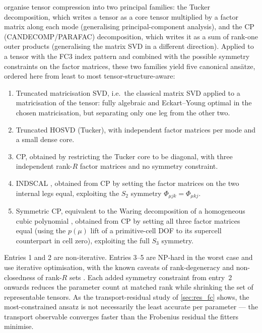 \citet{kolda_tensor_2009} organise tensor compression into two principal families: the
Tucker decomposition, which writes a tensor as a core tensor multiplied by a factor matrix
along each mode (generalising principal-component analysis), and the CP
(CANDECOMP/PARAFAC) decomposition, which writes it as a sum of rank-one outer products
(generalising the matrix SVD in a different direction). Applied to a tensor with the FC3 index
pattern and combined with the possible symmetry constraints on the factor matrices, these two
families yield five canonical ans\"atze, ordered here from least to most
tensor-structure-aware:
\begin{enumerate}
  \item Truncated matricisation SVD, i.e.\ the classical matrix SVD applied to a matricisation of
        the tensor: fully algebraic and Eckart--Young optimal in the chosen matricisation, but
        separating only one leg from the other two.
  \item Truncated HOSVD (Tucker), with independent factor matrices per mode and a small dense core.
  \item CP, obtained by restricting the Tucker core to be diagonal, with three
        independent rank-$R$ factor matrices and no symmetry constraint.
  \item INDSCAL \cite{carroll_analysis_1970}, obtained from CP by setting the
        factor matrices on the two internal legs equal, exploiting the
        $S_2$ symmetry $\Phi_{\mu j k} = \Phi_{\mu k j}$.
  \item Symmetric CP, equivalent to the Waring decomposition of a homogeneous
        cubic polynomial \cite{brachat_symmetric_2010, comon_symmetric_2008,
        oeding_eigenvectors_2013}, obtained from CP by setting all three factor
        matrices equal (using the $p(\mu)$ lift of a primitive-cell DOF to its
        supercell counterpart in cell zero), exploiting the full $S_3$
        symmetry.
\end{enumerate}
Entries 1 and 2 are non-iterative. Entries 3--5 are NP-hard in the worst case
\cite{hillar_most_2013} and use iterative optimisation, with the known caveats of
rank-degeneracy and non-closedness of rank-$R$ sets
\cite{stegeman_degeneracy_2006, de_silva_tensor_2008}. Each added symmetry constraint from
entry~2 onwards reduces the parameter count at matched rank while shrinking the set of
representable tensors. As the transport-residual study of \cref{sec:res_fc}
shows, the most-constrained ansatz is not necessarily the least accurate per
parameter --- the transport observable converges faster than the Frobenius
residual the fitters minimise.

